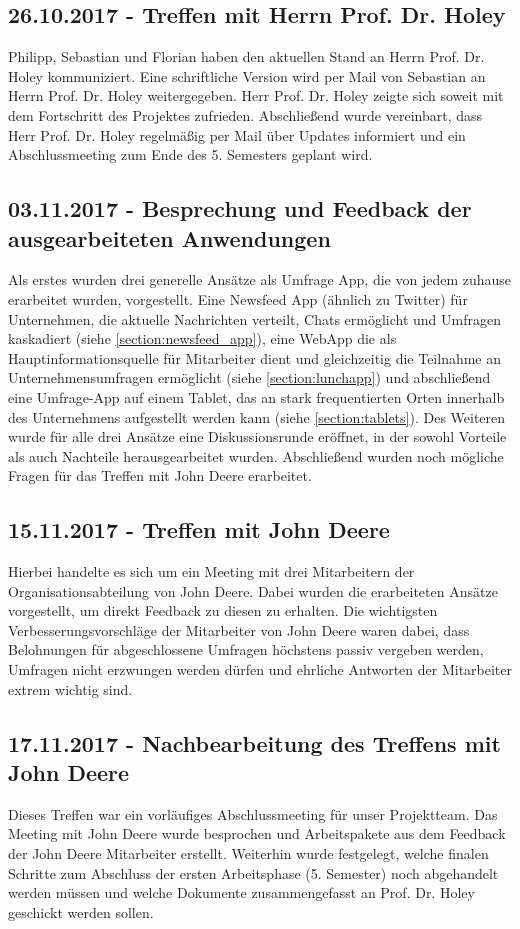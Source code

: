 \subsection{26.10.2017 - Treffen mit Herrn Prof. Dr. Holey}
Philipp, Sebastian und Florian haben den aktuellen Stand an Herrn Prof. Dr. Holey kommuniziert. Eine schriftliche Version wird per Mail von Sebastian an Herrn Prof. Dr. Holey weitergegeben. Herr Prof. Dr. Holey zeigte sich soweit mit dem Fortschritt des Projektes zufrieden. Abschließend wurde vereinbart, dass Herr Prof. Dr. Holey regelmäßig per Mail über Updates informiert und ein Abschlussmeeting zum Ende des 5. Semesters geplant wird.

\subsection{03.11.2017 - Besprechung und Feedback der ausgearbeiteten Anwendungen}
Als erstes wurden drei generelle Ansätze als Umfrage App, die von jedem zuhause erarbeitet wurden, vorgestellt. Eine Newsfeed App (ähnlich zu Twitter) für Unternehmen, die aktuelle Nachrichten verteilt, Chats ermöglicht und Umfragen kaskadiert (siehe \vref{section:newsfeed_app}), eine WebApp die als Hauptinformationsquelle für Mitarbeiter dient und gleichzeitig die Teilnahme an Unternehmensumfragen ermöglicht (siehe \vref{section:lunchapp}) und abschließend eine Umfrage-App auf einem Tablet, das an stark frequentierten Orten innerhalb des Unternehmens aufgestellt werden kann (siehe \vref{section:tablets}). Des Weiteren wurde für alle drei Ansätze eine Diskussionsrunde eröffnet, in der sowohl Vorteile als auch Nachteile herausgearbeitet wurden. Abschließend wurden noch mögliche Fragen für das Treffen mit John Deere erarbeitet.

\subsection{15.11.2017 - Treffen mit John Deere}
Hierbei handelte es sich um ein Meeting mit drei Mitarbeitern der Organisationsabteilung von John Deere. Dabei wurden die erarbeiteten Ansätze vorgestellt, um direkt Feedback zu diesen zu erhalten. Die wichtigsten Verbesserungsvorschläge der Mitarbeiter von John Deere waren dabei, dass Belohnungen für abgeschlossene Umfragen höchstens passiv vergeben werden, Umfragen nicht erzwungen werden dürfen und ehrliche Antworten der Mitarbeiter extrem wichtig sind.

\subsection{17.11.2017 - Nachbearbeitung des Treffens mit John Deere}
Dieses Treffen war ein vorläufiges Abschlussmeeting für unser Projektteam. Das Meeting mit John Deere wurde besprochen und Arbeitspakete aus dem Feedback der John Deere Mitarbeiter erstellt. Weiterhin wurde festgelegt, welche finalen Schritte zum Abschluss der ersten Arbeitsphase (5. Semester) noch abgehandelt werden müssen und welche Dokumente zusammengefasst an Prof. Dr. Holey geschickt werden sollen.

